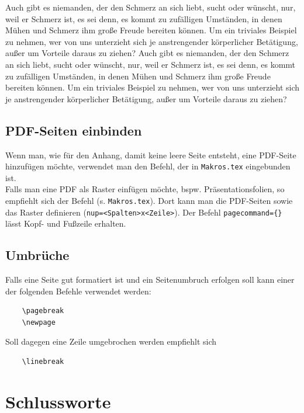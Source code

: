 \begin{multicols}{3}
	Auch gibt es niemanden, der den Schmerz an sich liebt, sucht oder wünscht, nur, weil er Schmerz ist, es sei denn, es kommt zu zufälligen Umständen, in denen Mühen und Schmerz ihm große Freude bereiten können. Um ein triviales Beispiel zu nehmen, wer von uns unterzieht sich je anstrengender körperlicher Betätigung, außer um Vorteile daraus zu ziehen? Auch gibt es niemanden, der den Schmerz an sich liebt, sucht oder wünscht, nur, weil er Schmerz ist, es sei denn, es kommt zu zufälligen Umständen, in denen Mühen und Schmerz ihm große Freude bereiten können. Um ein triviales Beispiel zu nehmen, wer von uns unterzieht sich je anstrengender körperlicher Betätigung, außer um Vorteile daraus zu ziehen?
\end{multicols}


\subsection{PDF-Seiten einbinden}

Wenn man, wie für den Anhang, damit keine leere Seite entsteht, eine PDF-Seite hinzufügen möchte, verwendet man den Befehl, der in \verb|Makros.tex| eingebunden ist.\\

Falls man eine PDF als Raster einfügen möchte, bspw. Präsentationsfolien, so empfiehlt sich der Befehl \verb|| (s. \verb|Makros.tex|). Dort kann man die PDF-Seiten sowie das Raster definieren (\verb|nup=<Spalten>x<Zeile>|). Der Befehl \verb|pagecommand={}| lässt Kopf- und Fußzeile erhalten.


\subsection{Umbrüche}

Falls eine Seite gut formatiert ist und ein Seitenumbruch erfolgen soll kann einer der folgenden Befehle verwendet werden:

\begin{verbatim}
    \pagebreak
    \newpage
\end{verbatim}

Soll dagegen eine Zeile umgebrochen werden empfiehlt sich 

\begin{verbatim}
    \linebreak
\end{verbatim}


\vfill
\section{Schlussworte}

